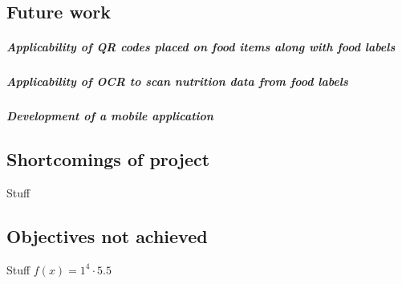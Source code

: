 \documentclass[11pt]{article}
\begin{document}
	\subsection{Future work}
		\subparagraph{Applicability of QR codes placed on food items along with food 				labels}
		\subparagraph{Applicability of OCR to scan nutrition data from food labels}
		\subparagraph{Development of a mobile application}
	\subsection{Shortcomings of project}
	Stuff	
	\subsection{Objectives not achieved}
	Stuff
	$f(x)=1^4\cdot5.5$
\pagebreak
\end{document}
